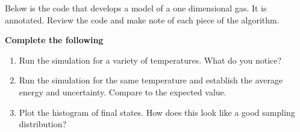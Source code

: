 Below is the code that develops a model of a one dimensional gas. It is
annotated. Review the code and make note of each piece of the algorithm.

\textbf{Complete the following}

\begin{enumerate}
\def\labelenumi{\arabic{enumi}.}
\tightlist
\item
  Run the simulation for a variety of temperatures. What do you notice?
\item
  Run the simulation for the same temperature and establish the average
  energy and uncertainty. Compare to the expected value.
\item
  Plot the histogram of final states. How does this look like a good
  sampling distribution?
\end{enumerate}

\begin{Shaded}
\begin{Highlighting}[]
\OperatorTok{\%}
\end{Highlighting}
\end{Shaded}

